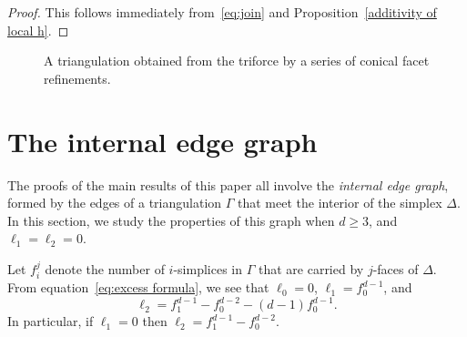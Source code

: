 \documentclass[10pt]{amsart}
\begin{document}
\begin{proof}
This follows immediately from~\eqref{eq:join} and Proposition~\ref{additivity of local h}.
\end{proof}

\begin{figure}[htb] \label{fig:conical-facet-refinement}
\centering
{} 

\caption{A triangulation obtained from the triforce by a series of conical facet refinements.}
\end{figure}




\section{The internal edge graph}

The proofs of the main results of this paper all involve the \emph{internal edge graph}, formed by the edges of a triangulation $\Gamma$ that meet the interior of the simplex $\Delta$. In this section, we study the properties of this graph when $d \geq 3$, and $\ell_1 = \ell_2 = 0$.

Let $f_i^j$ denote the number of $i$-simplices in $\Gamma$ that are carried by $j$-faces of $\Delta$. From equation~\eqref{eq:excess formula}, we see that $\ell_0 = 0$, $\ell_1 = f_0^{d-1}$, and
\begin{equation}\label{eqn:formula for l2}
\ell_2 = f_1^{d-1} -f_0^{d-2} - (d-1)f_0^{d-1}.
\end{equation}
In particular, if $\ell_1 = 0$ then $\ell_2 = f_1^{d-1} - f_0^{d-2}$.
\end{document}
